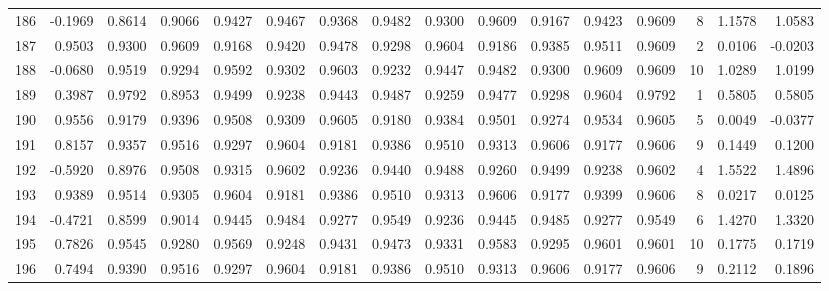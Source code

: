 \begin{tabular}{lrrrrrrrrrrrrrrr}
186 &     -0.1969 &  0.8614 &  0.9066 &  0.9427 &  0.9467 &  0.9368 &  0.9482 &  0.9300 &  0.9609 &  0.9167 &   0.9423 &     0.9609 &      8 &                    1.1578 &                     1.0583 \\
187 &      0.9503 &  0.9300 &  0.9609 &  0.9168 &  0.9420 &  0.9478 &  0.9298 &  0.9604 &  0.9186 &  0.9385 &   0.9511 &     0.9609 &      2 &                    0.0106 &                    -0.0203 \\
188 &     -0.0680 &  0.9519 &  0.9294 &  0.9592 &  0.9302 &  0.9603 &  0.9232 &  0.9447 &  0.9482 &  0.9300 &   0.9609 &     0.9609 &     10 &                    1.0289 &                     1.0199 \\
189 &      0.3987 &  0.9792 &  0.8953 &  0.9499 &  0.9238 &  0.9443 &  0.9487 &  0.9259 &  0.9477 &  0.9298 &   0.9604 &     0.9792 &      1 &                    0.5805 &                     0.5805 \\
190 &      0.9556 &  0.9179 &  0.9396 &  0.9508 &  0.9309 &  0.9605 &  0.9180 &  0.9384 &  0.9501 &  0.9274 &   0.9534 &     0.9605 &      5 &                    0.0049 &                    -0.0377 \\
191 &      0.8157 &  0.9357 &  0.9516 &  0.9297 &  0.9604 &  0.9181 &  0.9386 &  0.9510 &  0.9313 &  0.9606 &   0.9177 &     0.9606 &      9 &                    0.1449 &                     0.1200 \\
192 &     -0.5920 &  0.8976 &  0.9508 &  0.9315 &  0.9602 &  0.9236 &  0.9440 &  0.9488 &  0.9260 &  0.9499 &   0.9238 &     0.9602 &      4 &                    1.5522 &                     1.4896 \\
193 &      0.9389 &  0.9514 &  0.9305 &  0.9604 &  0.9181 &  0.9386 &  0.9510 &  0.9313 &  0.9606 &  0.9177 &   0.9399 &     0.9606 &      8 &                    0.0217 &                     0.0125 \\
194 &     -0.4721 &  0.8599 &  0.9014 &  0.9445 &  0.9484 &  0.9277 &  0.9549 &  0.9236 &  0.9445 &  0.9485 &   0.9277 &     0.9549 &      6 &                    1.4270 &                     1.3320 \\
195 &      0.7826 &  0.9545 &  0.9280 &  0.9569 &  0.9248 &  0.9431 &  0.9473 &  0.9331 &  0.9583 &  0.9295 &   0.9601 &     0.9601 &     10 &                    0.1775 &                     0.1719 \\
196 &      0.7494 &  0.9390 &  0.9516 &  0.9297 &  0.9604 &  0.9181 &  0.9386 &  0.9510 &  0.9313 &  0.9606 &   0.9177 &     0.9606 &      9 &                    0.2112 &                     0.1896 \\

\end{tabular}
